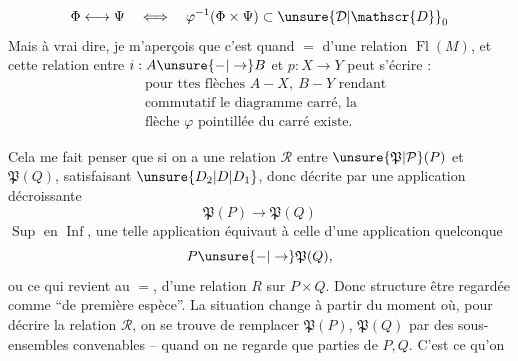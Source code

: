 \[
\Phi\longleftrightarrow\Psi\quad\Longleftrightarrow\quad
\varphi^{-1}(\Phi\times\Psi)\subset\unsure{\mathcal{D}|\mathscr{D}}_0
\]
Mais à vrai dire, je m'aperçois que c'est
quand $=$  d'une relation 
   $\operatorname{Fl}(M)$,  et cette relation
 entre $i:A\unsure{-|\to}B$ et $p:X\to Y$
peut s'écrire  :
\[
\begin{aligned}
&\text{pour ttes flèches } A-X,\ B-Y\text{ rendant}\\
&\text{commutatif le diagramme carré, la}\\
&\text{flèche }\varphi\text{ pointillée du carré existe.}
\end{aligned}\tag*{$(**)$}
\]

Cela me fait penser que si on a
une relation $\mathcal{R}$ entre $\unsure{\mathfrak{P}|\mathcal{P}}(P)$ et $\mathfrak{P}(Q)$,
satisfaisant $\unsure{D_2|D|D_1}$, donc décrite par une
application décroissante
\[
\mathfrak{P}(P)\longrightarrow\mathfrak{P}(Q)
\]
 $\operatorname{Sup}$ en $\operatorname{Inf}$,  une
telle application équivaut à celle d'une
application quelconque
\[
P\unsure{-|\to}\mathfrak{P}(Q),
\]
ou ce qui revient au $=$, d'une relation
$R$ sur $P\times Q$. Donc  structure
  être regardée comme ``de première
espèce''. La situation change à partir
du moment où, pour décrire la relation
$\mathcal{R}$, on se trouve  de remplacer
$\mathfrak{P}(P)$, $\mathfrak{P}(Q)$ par des sous-ensembles
convenables -- quand on ne regarde que
\uline{} parties de $P,Q$. C'est ce qu'on
